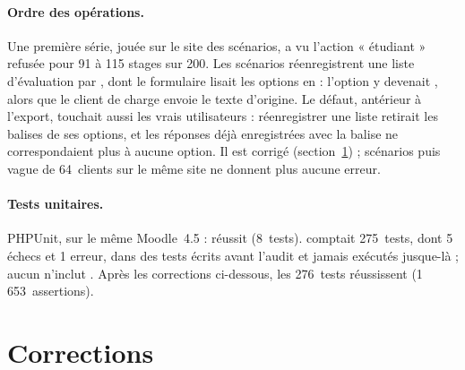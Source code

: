 \documentclass[11pt,a4paper]{article}
\begin{document}
\paragraph{Ordre des opérations.} Une première série, jouée sur le site des scénarios, a vu
l'action « étudiant » refusée pour 91 à 115 stages sur 200. Les scénarios réenregistrent une liste
d'évaluation par , dont le formulaire lisait les options en
 : l'option  y devenait , alors que le client
de charge envoie le texte d'origine. Le défaut, antérieur à l'export, touchait aussi les vrais
utilisateurs : réenregistrer une liste retirait les balises de ses options, et les réponses déjà
enregistrées avec la balise ne correspondaient plus à aucune option. Il est corrigé
(section~\ref{sec:corrections}) ; scénarios puis vague de 64~clients sur le même site ne donnent
plus aucune erreur.

\paragraph{Tests unitaires.} PHPUnit, sur le même Moodle~4.5 : 
réussit (8~tests).  comptait 275~tests, dont 5 échecs et 1 erreur, dans des tests
écrits avant l'audit et jamais exécutés jusque-là ; aucun n'inclut . Après les
corrections ci-dessous, les 276~tests réussissent (1\,653~assertions).

\section{Corrections}\label{sec:corrections}
\end{document}
